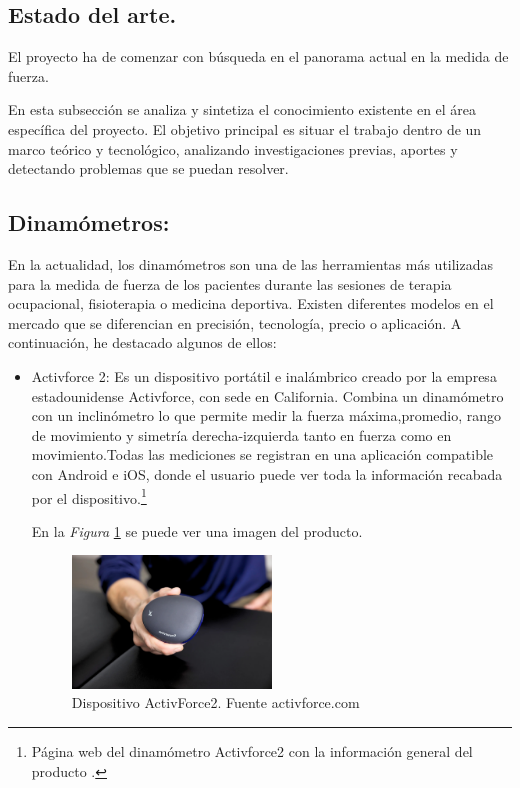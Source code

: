 \begin{itemize}
\section{Estado del arte.}

El proyecto ha de comenzar con búsqueda en el panorama actual en la medida de fuerza. 

En esta subsección se analiza y sintetiza el conocimiento existente en el área específica del proyecto. El objetivo principal es situar el trabajo dentro de un marco teórico y tecnológico, analizando investigaciones previas, aportes y detectando problemas que se puedan resolver.
\subsection{Dinamómetros:}
En la actualidad, los dinamómetros son una de las herramientas más utilizadas  para la medida de fuerza de los pacientes durante las sesiones de terapia ocupacional, fisioterapia o medicina deportiva. Existen diferentes modelos en el mercado que se diferencian en precisión, tecnología, precio o aplicación. 
A continuación, he destacado algunos de ellos:
\begin{itemize}
    \item Activforce 2: Es un dispositivo portátil e inalámbrico creado por la empresa estadounidense Activforce, con sede en California. Combina un dinamómetro con un inclinómetro lo que permite medir la fuerza máxima,promedio, rango de movimiento y simetría derecha-izquierda tanto en fuerza como en movimiento.Todas las mediciones se registran en una aplicación compatible con Android e iOS, donde el usuario puede ver toda la información recabada por el dispositivo.\cite{activforce}\footnote{Página web del dinamómetro Activforce2 con la información general del producto \cite{activforce}.}
    
    En la \textit{Figura} \ref{fig:activforce} se puede ver una imagen del producto.
    \begin{figure}[h]
        \centering
        \includegraphics[width=0.5\textwidth]{img/ActivForce_Device.jpg}
        \caption{Dispositivo ActivForce2. Fuente activforce.com}
        \label{fig:activforce}
    \end{figure}
    

\end{itemize}
\end{itemize}
